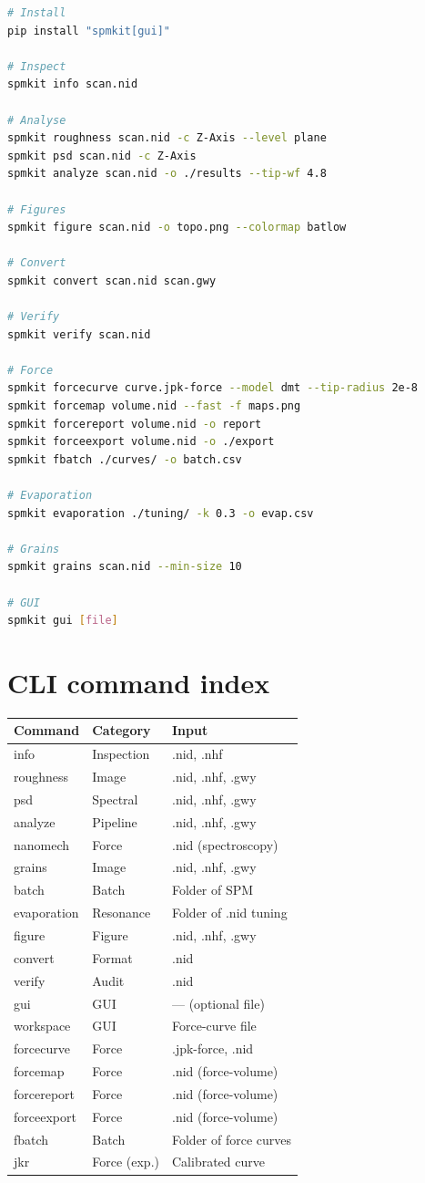 \documentclass[a4paper,11pt]{article}
\begin{document}
\begin{lstlisting}[language=bash]
# Install
pip install "spmkit[gui]"

# Inspect
spmkit info scan.nid

# Analyse
spmkit roughness scan.nid -c Z-Axis --level plane
spmkit psd scan.nid -c Z-Axis
spmkit analyze scan.nid -o ./results --tip-wf 4.8

# Figures
spmkit figure scan.nid -o topo.png --colormap batlow

# Convert
spmkit convert scan.nid scan.gwy

# Verify
spmkit verify scan.nid

# Force
spmkit forcecurve curve.jpk-force --model dmt --tip-radius 2e-8
spmkit forcemap volume.nid --fast -f maps.png
spmkit forcereport volume.nid -o report
spmkit forceexport volume.nid -o ./export
spmkit fbatch ./curves/ -o batch.csv

# Evaporation
spmkit evaporation ./tuning/ -k 0.3 -o evap.csv

# Grains
spmkit grains scan.nid --min-size 10

# GUI
spmkit gui [file]
\end{lstlisting}

\section{CLI command index}

\begin{longtable}{@{}>{\ttfamily}l l l@{}}
\toprule
Command & Category & Input \\
\midrule
info & Inspection & .nid, .nhf \\
roughness & Image & .nid, .nhf, .gwy \\
psd & Spectral & .nid, .nhf, .gwy \\
analyze & Pipeline & .nid, .nhf, .gwy \\
nanomech & Force & .nid (spectroscopy) \\
grains & Image & .nid, .nhf, .gwy \\
batch & Batch & Folder of SPM \\
evaporation & Resonance & Folder of .nid tuning \\
figure & Figure & .nid, .nhf, .gwy \\
convert & Format & .nid \\
verify & Audit & .nid \\
gui & GUI & --- (optional file) \\
workspace & GUI & Force-curve file \\
forcecurve & Force & .jpk-force, .nid \\
forcemap & Force & .nid (force-volume) \\
forcereport & Force & .nid (force-volume) \\
forceexport & Force & .nid (force-volume) \\
fbatch & Batch & Folder of force curves \\
jkr & Force (exp.) & Calibrated curve \\
\bottomrule
\end{longtable}
\end{document}
